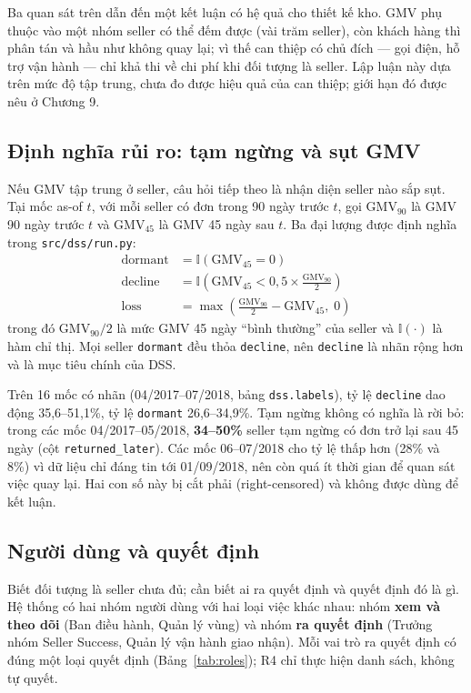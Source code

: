 Ba quan sát trên dẫn đến một kết luận có hệ quả cho thiết kế kho. GMV phụ thuộc vào một nhóm seller có thể đếm được (vài trăm seller), còn khách hàng thì phân tán và hầu như không quay lại; vì thế can thiệp có chủ đích — gọi điện, hỗ trợ vận hành — chỉ khả thi về chi phí khi đối tượng là seller. Lập luận này dựa trên mức độ tập trung, chưa đo được hiệu quả của can thiệp; giới hạn đó được nêu ở Chương 9.

\subsection{Định nghĩa rủi ro: tạm ngừng và sụt GMV}
Nếu GMV tập trung ở seller, câu hỏi tiếp theo là nhận diện seller nào sắp sụt. Tại mốc as-of $t$, với mỗi seller có đơn trong 90 ngày trước $t$, gọi $\text{GMV}_{90}$ là GMV 90 ngày trước $t$ và $\text{GMV}_{45}$ là GMV 45 ngày sau $t$. Ba đại lượng được định nghĩa trong \texttt{src/dss/run.py}:
\begin{align}
\text{dormant} &= \mathbb{I}(\text{GMV}_{45} = 0) \\
\text{decline} &= \mathbb{I}\!\left(\text{GMV}_{45} < 0{,}5 \times \tfrac{\text{GMV}_{90}}{2}\right) \\
\text{loss} &= \max\!\left(\tfrac{\text{GMV}_{90}}{2} - \text{GMV}_{45},\; 0\right)
\end{align}
trong đó $\text{GMV}_{90}/2$ là mức GMV 45 ngày ``bình thường'' của seller và $\mathbb{I}(\cdot)$ là hàm chỉ thị. Mọi seller \texttt{dormant} đều thỏa \texttt{decline}, nên \texttt{decline} là nhãn rộng hơn và là mục tiêu chính của DSS.

Trên 16 mốc có nhãn (04/2017--07/2018, bảng \texttt{dss.labels}), tỷ lệ \texttt{decline} dao động 35,6--51,1\%, tỷ lệ \texttt{dormant} 26,6--34,9\%. Tạm ngừng không có nghĩa là rời bỏ: trong các mốc 04/2017--05/2018, \textbf{34--50\%} seller tạm ngừng có đơn trở lại sau 45 ngày (cột \texttt{returned\_later}). Các mốc 06--07/2018 cho tỷ lệ thấp hơn (28\% và 8\%) vì dữ liệu chỉ đáng tin tới 01/09/2018, nên còn quá ít thời gian để quan sát việc quay lại. Hai con số này bị cắt phải (right-censored) và không được dùng để kết luận.

\subsection{Người dùng và quyết định}
Biết đối tượng là seller chưa đủ; cần biết ai ra quyết định và quyết định đó là gì. Hệ thống có hai nhóm người dùng với hai loại việc khác nhau: nhóm \textbf{xem và theo dõi} (Ban điều hành, Quản lý vùng) và nhóm \textbf{ra quyết định} (Trưởng nhóm Seller Success, Quản lý vận hành giao nhận). Mỗi vai trò ra quyết định có đúng một loại quyết định (Bảng~\ref{tab:roles}); R4 chỉ thực hiện danh sách, không tự quyết.

